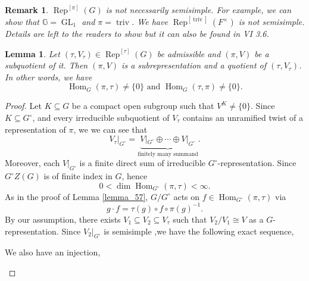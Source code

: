 \documentclass[8pt]{article}
\newtheorem{lemma}{Lemma}[section]
\newtheorem{remark}{Remark}[section]
\DeclareMathOperator{\triv}{triv}
\DeclareMathOperator{\GL}{GL}
\DeclareMathOperator{\Rep}{Rep}
\DeclareMathOperator{\Hom}{Hom}
\newcommand{\G}[0]{\mathbb{G}}
\begin{document}
\begin{remark}
  $\Rep^{[\pi]}(G)$ is not necessarily semisimple. For example, we can show that $\G=\GL_1$ and $\pi=\triv$. We have $\Rep^{[\triv]}(F^\times)$ is not semisimple. Details are left to the readers to show but it can also be found in \cite{Renard} VI 3.6.
\end{remark}
\begin{lemma}
  Let $(\tau,V_\tau)\in\Rep^{[\tau]}(G)$ be admissible and $(\pi,V)$ be a subquotient of it. Then $(\pi,V)$ is a subrepresentation and a quotient of $(\tau,V_\tau)$. In other words, we have 
  \begin{equation*}
    \Hom_G(\pi,\tau)\not=\{0\}\text{ and }\Hom_G(\tau,\pi)\not=\{0\}.
  \end{equation*}
  \label{lemma_59}
\end{lemma}
\begin{proof}
  Let $K\subseteq G$ be a compact open subgroup such that $V^K\not=\{0\}$. Since $K\subseteq G^\circ$, and every irreducible subquotient of $V_\tau$ contains an unramified twist of a representation of $\pi$, we we can see that 
  \begin{equation*}
    V_\tau|_{G^\circ} = \underbrace{V|_{G^\circ}\oplus\cdots\oplus V|_{G^\circ}}_{\text{finitely many summand}}.
  \end{equation*}
  Moreover, each $V|_{G^\circ}$ is a finite direct sum of irreducible $G^\circ$-representation. Since $G^\circ Z(G)$ is of finite index in $G$, hence 
  \begin{equation*}
    0<\dim\Hom_{G^\circ}(\pi,\tau)<\infty.
  \end{equation*}
  As in the proof of Lemma \ref{lemma_57}, $G/G^\circ$ acts on $f\in\Hom_{G^\circ}(\pi,\tau)$ via 
  \begin{equation*}
    g\cdot f = \tau(g)\circ f\circ \pi(g)^{-1}.
  \end{equation*}
  By our assumption, there exists $V_1\subseteq V_2\subseteq V_\tau$ such that $V_2/V_1\cong V$ as a $G$-representation. Since $V_2|_{G^\circ}$ is semisimple ,we have the following exact sequence,
  \begin{center}
  \end{center}
  We also have an injection,
  \begin{center}

\end{center}
\end{proof}
\end{document}
